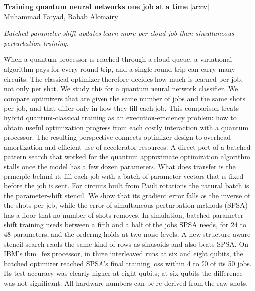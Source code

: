 \documentclass[12pt,letterpaper]{article}
\begin{document}
\medskip
{\small\textbf{Training quantum neural networks one job at a time}} {\scriptsize[\href{https://arxiv.org/abs/2611.16365}{arxiv}]}\nopagebreak\\
{\scriptsize Muhammad Faryad, Rabab Alomairy}\nopagebreak\\[2pt]
{\footnotesize\textit{Batched parameter-shift updates learn more per cloud job than simultaneous-perturbation training.}\par}\nopagebreak
{\footnotesize When a quantum processor is reached through a cloud queue, a variational algorithm pays for every round trip, and a single round trip can carry many circuits. The classical optimizer therefore decides how much is learned per job, not only per shot. We study this for a quantum neural network classifier. We compare optimizers that are given the same number of jobs and the same shots per job, and that differ only in how they fill each job. This comparison treats hybrid quantum-classical training as an execution-efficiency problem: how to obtain useful optimization progress from each costly interaction with a quantum processor. The resulting perspective connects optimizer design to overhead amortization and efficient use of accelerator resources. A direct port of a batched pattern search that worked for the quantum approximate optimization algorithm stalls once the model has a few dozen parameters. What does transfer is the principle behind it: fill each job with a batch of parameter vectors that is fixed before the job is sent. For circuits built from Pauli rotations the natural batch is the parameter-shift stencil. We show that its gradient error falls as the inverse of the shots per job, while the error of simultaneous-perturbation methods (SPSA) has a floor that no number of shots removes. In simulation, batched parameter-shift training needs between a fifth and a half of the jobs SPSA needs, for 24 to 48 parameters, and the ordering holds at two noise levels. A new structure-aware stencil search reads the same kind of rows as sinusoids and also beats SPSA. On IBM's ibm\_fez processor, in three interleaved runs at six and eight qubits, the batched optimizer reached SPSA's final training loss within 4 to 20 of its 50 jobs. Its test accuracy was clearly higher at eight qubits; at six qubits the difference was not significant. All hardware numbers can be re-derived from the raw shots.\par}
\medskip
\end{document}

